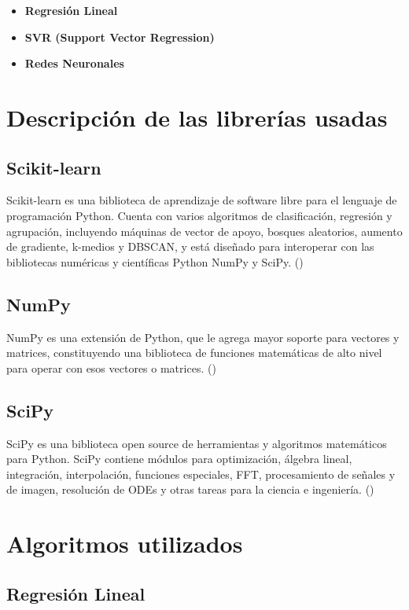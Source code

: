 	\begin{itemize}
	\item \textbf{Regresión Lineal} 
	\item \textbf{SVR (Support Vector Regression)} 
	\item \textbf{Redes Neuronales} 
\end{itemize}


\section{Descripción de las librerías usadas}
\label{makereference4.2}
	\subsection{Scikit-learn}
	\label{makereference4.2.1}
	Scikit-learn es una biblioteca de aprendizaje de software libre para el lenguaje de programación Python. Cuenta con varios algoritmos de clasificación, regresión y agrupación, incluyendo máquinas de vector de apoyo, bosques aleatorios, aumento de gradiente, k-medios y DBSCAN, y está diseñado para interoperar con las bibliotecas numéricas y científicas Python NumPy y SciPy. (\cite{ARP:Scikit:2017})
	
	\subsection{NumPy}
	\label{makereference4.2.2}
	NumPy es una extensión de Python, que le agrega mayor soporte para vectores y matrices, constituyendo una biblioteca de funciones matemáticas de alto nivel para operar con esos vectores o matrices. (\cite{ARP:Numpy:2017})
	
	\subsection{SciPy}
	\label{makereference4.2.3}
	SciPy es una biblioteca open source de herramientas y algoritmos matemáticos para Python. SciPy contiene módulos para optimización, álgebra lineal, integración, interpolación, funciones especiales, FFT, procesamiento de señales y de imagen, resolución de ODEs y otras tareas para la ciencia e ingeniería. (\cite{ARP:Scipy:2017})
	
\section{Algoritmos utilizados}
\label{makereference4.3}
	\subsection{Regresión Lineal}
	\label{makereference4.3.1}

